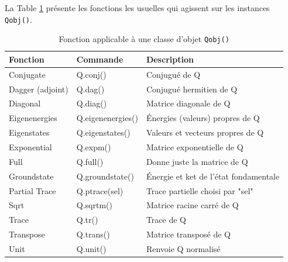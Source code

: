 La Table \ref{tab:fonction} présente les fonctions les usuelles qui agissent 
sur les instances \texttt{Qobj()}.
\begin{table}[!h]
\centering
\begin{tabular}{|l|l|l|} \hline \hline
\textbf{Fonction}	& \textbf{Commande}	& \textbf{Description} \\ 
\hline \hline
Conjugate	& Q.conj()	& Conjugué de Q\\ \hline
Dagger (adjoint)	& Q.dag()	& Conjugué hermitien de Q\\ \hline
Diagonal	& Q.diag()	& Matrice diagonale de Q\\ \hline
Eigenenergies	& Q.eigenenergies()	&  Énergies (valeurs) propres de Q\\ 
\hline
Eigenstates	& Q.eigenstates()	& Valeurs et vecteurs propres de Q\\ 
\hline
Exponential	& Q.expm()	& Matrice exponentielle de Q\\ \hline
Full	& Q.full()	& Donne juste la matrice de Q\\ \hline
Groundstate	& Q.groundstate()	& Énergie et ket de l'état 
fondamentale\\ \hline
Partial Trace	& Q.ptrace(sel)	& Trace partielle choisi par "sel"\\ \hline
Sqrt	& Q.sqrtm()	& Matrice racine carré de Q\\ \hline
Trace	& Q.tr()	&  Trace de Q \\ \hline
Transpose	&  Q.trans()	& Matrice transposé de Q \\ \hline
Unit	& Q.unit()	& Renvoie Q normalisé \\ \hline
\end{tabular}
\caption{Fonction applicable à une classe  d'objet \texttt{Qobj()}}
\label{tab:fonction}
\end{table}

